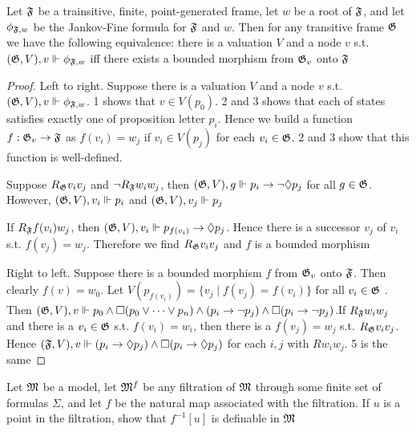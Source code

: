 \documentclass[11pt]{article}
\begin{document}
\begin{exercise}
\label{ex3.4.1}
Let \(\mathfrak{F}\) be a trainsitive, finite, point-generated frame, let \(w\) be a
root of \(\mathfrak{F}\), and let \(\phi_{\mathfrak{F},w}\) be the Jankov-Fine formula for
\(\mathfrak{F}\) and \(w\). Then for any transitive frame \(\mathfrak{G}\) we have the
following equivalence: there is a valuation \(V\) and a node \(v\) s.t.
\((\mathfrak{G},V),v\Vdash\phi_{\mathfrak{F},w}\) iff there exists a bounded morphism from
\(\mathfrak{G}_v\) onto \(\mathfrak{F}\)
\end{exercise}

\begin{proof}
Left to right. Suppose there is a valuation \(V\) and a node \(v\) s.t.
\((\mathfrak{G},V),v\Vdash\phi_{\mathfrak{F},w}\).  1 shows that \(v\in V(p_0)\). 2 and 3
shows that each of states satisfies exactly one of proposition letter
\(p_i\). Hence we build a function \(f:\mathfrak{G}_v\to\mathfrak{F}\) as \(f(v_i)=w_j\) if
\(v_i\in V(p_j)\) for each \(v_i\in\mathfrak{G}\). 2 and 3 show that this function is
well-defined.

Suppose \(R_{\mathfrak{G}}v_iv_j\) and \(\neg R_{\mathfrak{F}}w_iw_j\), then \((\mathfrak{G},V),g\Vdash
    p_i\to\neg\Diamond p_j\) for all \(g\in\mathfrak{G}\). However, \((\mathfrak{G},V),v_i\Vdash
    p_i\) and \((\mathfrak{G},V),v_j\Vdash p_j\)

If \(R_{\mathfrak{F}}f(v_i)w_j\), then \((\mathfrak{G},V),v_i\Vdash p_{f(v_i)}\to\Diamond
    p_j\). Hence there is a successor \(v_j\) of \(v_i\) s.t. \(f(v_j)=w_j\).
Therefore we find \(R_{\mathfrak{G}}v_iv_j\) and \(f\) is a bounded morphism

Right to left. Suppose there is a bounded morphism \(f\) from \(\mathfrak{G}_v\) onto
\(\mathfrak{F}\). Then clearly \(f(v)=w_0\). Let \(V(p_{f(v_i)})=\{v_j\mid f(v_j)=f(v_i)\}\) for all
\(v_i\in\mathfrak{G}\) . Then \((\mathfrak{G},V),v\Vdash p_0\wedge\Box(p_0\vee\dots\vee p_n)
    \wedge(p_i\to\neg p_j)\wedge\Box(p_i\to\neg p_j)\).If \(R_{\mathfrak{F}}w_iw_j\) and
there is a \(v_i\in\mathfrak{G}\) s.t. \(f(v_i)=w_i\), then there is a \(f(v_j)=w_j\)
s.t. \(R_{\mathfrak{G}}v_iv_j\). Hence \((\mathfrak{F},V),v\Vdash (p_i\to\Diamond
    p_j)\wedge\Box(p_i\to\Diamond p_j)\) for each \(i,j\) with \(Rw_iw_j\). 5 is
the same
\end{proof}

\begin{exercise}
\label{ex3.4.2}
Let \(\mathfrak{M}\) be a model, let \(\mathfrak{M}^f\) be any filtration of \(\mathfrak{M}\) through
some finite set of formulas \(\Sigma\), and let \(f\) be the natural map associated
with the filtration. If \(u\) is a point in the filtration, show that
\(f^{-1}[u]\) is definable in \(\mathfrak{M}\)
\end{exercise}
\end{document}
